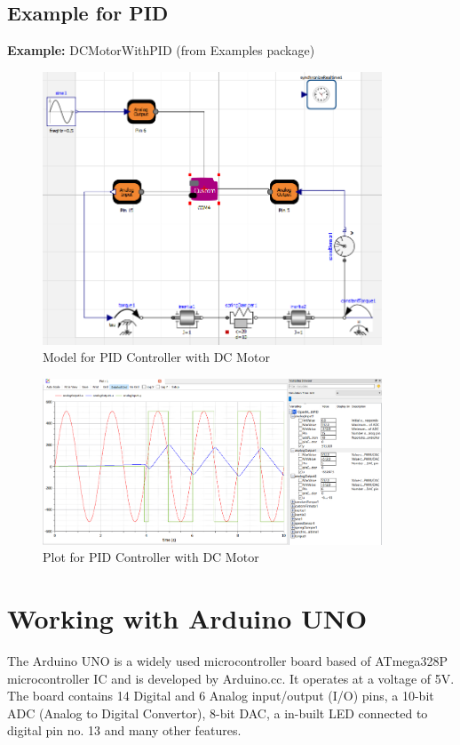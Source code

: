 \documentclass[12pt,a4paper]{report}
\begin{document}
\section{Example for PID}
\textbf{Example:} DCMotorWithPID (from Examples package)
\begin{figure}[H]
\centering
\includegraphics[width =0.9\textwidth]{pid_ex}
\caption{Model for PID Controller with DC Motor}
\label{figure:25}
\end{figure}
\begin{figure}[H]
\centering
\includegraphics[width = 0.9\textwidth]{pid_graph}
\caption{Plot for PID Controller with DC Motor}
\label{figure:26}
\end{figure}

\chapter{\textbf{Working with Arduino UNO}}
The Arduino UNO is a widely used microcontroller board based of ATmega328P microcontroller IC and is developed by Arduino.cc. It operates at a voltage of 5V. The board contains 14 Digital and 6 Analog input/output (I/O) pins, a 10-bit ADC (Analog to Digital Convertor), 8-bit DAC, a in-built LED connected to digital pin no. 13 and many other features.
\end{document}
